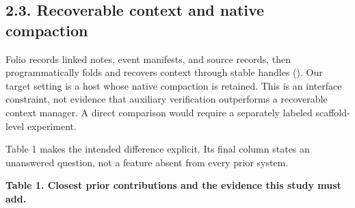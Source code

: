 \documentclass[
  11pt,
  a4paper,
]{article}
\begin{document}
\subsection{2.3. Recoverable context and native
compaction}\label{recoverable-context-and-native-compaction}

Folio records linked notes, event manifests, and source records, then
programmatically folds and recovers context through stable handles
(). Our target setting is
a host whose native compaction is retained. This is an interface
constraint, not evidence that auxiliary verification outperforms a
recoverable context manager. A direct comparison would require a
separately labeled scaffold-level experiment.

Table 1 makes the intended difference explicit. Its final column states
an unanswered question, not a feature absent from every prior system.


\textbf{Table 1. Closest prior contributions and the evidence this study
must add.}
\end{document}
